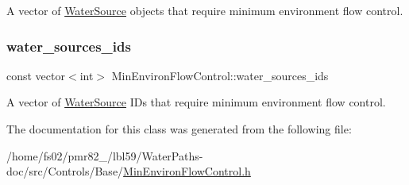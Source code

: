 A vector of \mbox{\hyperlink{classWaterSource}{Water\+Source}} objects that require minimum environment flow control. 

\mbox{\label{classMinEnvironFlowControl_a1544571a77557853d0cc8189bd29f4b3}} 
\subsubsection{\texorpdfstring{water\+\_\+sources\+\_\+ids}{water\_sources\_ids}}
{\footnotesize\ttfamily const vector$<$int$>$ Min\+Environ\+Flow\+Control\+::water\+\_\+sources\+\_\+ids}



A vector of \mbox{\hyperlink{classWaterSource}{Water\+Source}} I\+Ds that require minimum environment flow control. 



The documentation for this class was generated from the following file\+:\begin{DoxyCompactItemize}
\item 
/home/fs02/pmr82\+\_/lbl59/\+Water\+Paths-\/doc/src/\+Controls/\+Base/\mbox{\hyperlink{MinEnvironFlowControl_8h}{Min\+Environ\+Flow\+Control.\+h}}\end{DoxyCompactItemize}
